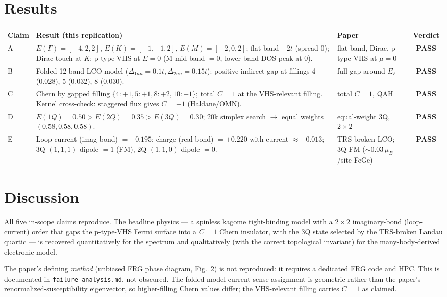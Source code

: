 \documentclass[11pt]{article}
\begin{document}
\section{Results}
\begin{table}[h]\centering
\begin{tabular}{p{0.9cm} p{7.8cm} p{2.4cm} c}
\toprule
Claim & Result (this replication) & Paper & Verdict\\
\midrule
A & $E(\Gamma){=}[-4,2,2]$, $E(K){=}[-1,-1,2]$, $E(M){=}[-2,0,2]$; flat band
$+2t$ (spread $0$); Dirac touch at $K$; p-type VHS at $E{=}0$ (M mid-band $=0$,
lower-band DOS peak at $0$). & flat band, Dirac, p-type VHS at $\mu{=}0$ & \textbf{PASS}\\
\addlinespace
B & Folded 12-band LCO model ($\Delta_{1nn}{=}0.1t,\Delta_{2nn}{=}0.15t$):
positive indirect gap at fillings 4 (0.028), 5 (0.032), 8 (0.030). & full gap
around $E_F$ & \textbf{PASS}\\
\addlinespace
C & Chern by gapped filling $\{4{:}{+}1,5{:}{+}1,8{:}{+}2,10{:}{-}1\}$; total
$C=1$ at the VHS-relevant filling. Kernel cross-check: staggered flux gives
$C=-1$ (Haldane/OMN). & total $C=1$, QAH & \textbf{PASS}\\
\addlinespace
D & $E(1Q){=}0.50>E(2Q){=}0.35>E(3Q){=}0.30$; 20k simplex search $\to$ equal
weights $(0.58,0.58,0.58)$. & equal-weight 3Q, $2\times2$ & \textbf{PASS}\\
\addlinespace
E & Loop current (imag bond) $=-0.195$; charge (real bond) $=+0.220$ with
current $\approx-0.013$; 3Q $(1,1,1)$ dipole $=1$ (FM), 2Q $(1,1,0)$ dipole
$=0$. & TRS-broken LCO; 3Q FM ($\sim0.03\,\mu_B$/site FeGe) & \textbf{PASS}\\
\bottomrule
\end{tabular}
\end{table}

\section{Discussion}
All five in-scope claims reproduce. The headline physics --- a spinless kagome
tight-binding model with a $2\times2$ imaginary-bond (loop-current) order that
gaps the p-type-VHS Fermi surface into a $C=1$ Chern insulator, with the 3Q
state selected by the TRS-broken Landau quartic --- is recovered quantitatively
for the spectrum and qualitatively (with the correct topological invariant) for
the many-body-derived electronic model.

The paper's defining \emph{method} (unbiased FRG phase diagram, Fig.~2) is not
reproduced: it requires a dedicated FRG code and HPC. This is documented in
\texttt{failure\_analysis.md}, not obscured. The folded-model current-sense
assignment is geometric rather than the paper's renormalized-susceptibility
eigenvector, so higher-filling Chern values differ; the VHS-relevant filling
carries $C=1$ as claimed.
\end{document}
